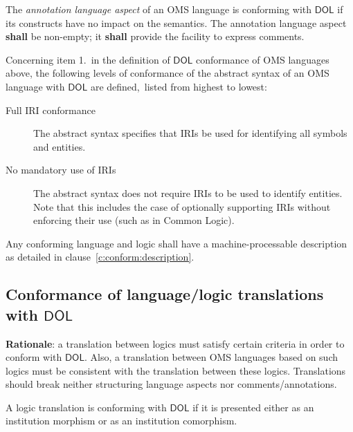 \documentclass[10pt,fleqn,final]{scrreprt}
\newcommand{\cbs}[0]{\color{red}\xspace} %
\newcommand{\cbe}[0]{\color{black}\xspace} %
\newcommand*{\shall}{\textbf{shall}\xspace}
\newcommand*{\may}{\textbf{may}\xspace}
\newcommand*{\DOL}{\ensuremath{\mathsf{DOL}}\xspace}
\newcommand{\clauserefname}{clause}
\newcommand{\cref}[1]{\clauserefname~\ref{#1}}
\newcommand{\ssclause}[1]{\subsection{#1}}
\begin{document}
The \emph{annotation language aspect} of an OMS language is conforming with \DOL if its constructs
have no impact on the semantics. The annotation language aspect \shall be non-empty; it \shall
provide the facility to express comments.

\cbs
Concerning item 1.\ in the definition of \DOL conformance of OMS
languages above, the following levels of conformance of the abstract
syntax of an OMS language with \DOL are defined,\cbe\ 
listed from highest to lowest:

\begin{description}
\item[Full IRI conformance] The abstract syntax specifies that IRIs be used for
 identifying all symbols and entities.
\item[No mandatory use of IRIs] The abstract syntax does not require  IRIs
 to be used to identify entities. Note that this includes the case of
  optionally supporting IRIs without enforcing their use (such as in Common
  Logic).
\end{description}

Any conforming language and logic shall have a machine-processable description
 as detailed in \cref{c:conform:description}.

\ssclause{Conformance of language/logic translations with \DOL}\label{c:conform:translation}
\begin{fminipage}{\textwidth}
\textbf{Rationale}: a translation between logics must satisfy certain criteria in order to conform with \DOL.
Also, a translation between OMS languages based on such logics must be consistent with the
translation between these logics.  Translations should break neither structuring language aspects nor comments/annotations.
\end{fminipage}

A logic translation is conforming with \DOL if it is presented either as an institution morphism or
as an institution comorphism.  
\end{document}
